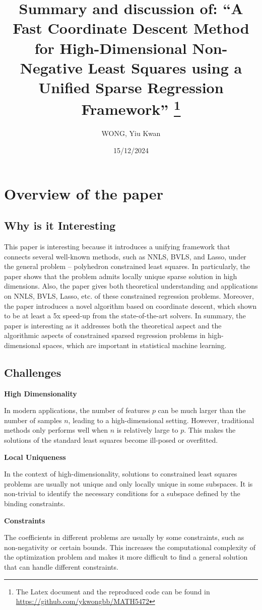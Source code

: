 \documentclass[11pt]{article}
\title{\textbf{Summary and discussion of: ``A Fast Coordinate Descent Method for High-Dimensional Non-Negative Least Squares using a Unified Sparse Regression Framework'' \footnote{The Latex document and the reproduced code can be found in \url{https://github.com/ykwongbb/MATH5472}}}\\}
\author{WONG, Yiu Kwan}
\date{15/12/2024}
\begin{document}
\maketitle
\tableofcontents

\section{Overview of the paper} 
\subsection{Why is it Interesting}
This paper is interesting because it introduces a unifying framework that connects several 
well-known methods, such as NNLS, BVLS, and Lasso, under the general problem -- polyhedron 
constrained least squares. In particularly, the paper shows that the problem admits locally
unique sparse solution in high dimensions. Also, the paper gives both theoretical understanding 
and applications on NNLS, BVLS, Lasso, etc. of these constrained regression problems.
Moreover, the paper introduces a novel algorithm based on coordinate descent, which shown 
to be at least a 5x speed-up from the state-of-the-art solvers. In summary, the paper is interesting 
as it addresses both the theoretical aspect and the algorithmic aspects of constrained sparsed 
regression problems in high-dimensional spaces, which are important in statistical machine learning.


\subsection{Challenges}
\textbf{High Dimensionality}

In modern applications, the number of features $p$ can be much larger than the number of samples
$n$, leading to a high-dimensional setting. However, traditional methods only performs well when
$n$ is relatively large to $p$. This makes the solutions of the standard least squares become 
ill-posed or overfitted.

\textbf{Local Uniqueness}

In the context of high-dimensionality, solutions to constrained least squares problems are usually
not unique and only locally unique in some subspaces. It is non-trivial to identify the necessary 
conditions for a subspace defined by the binding constraints.

\textbf{Constraints}

The coefficients in different problems are usually by some constraints, such as non-negativity or
certain bounds. This increases the computational complexity of the optimization problem and makes 
it more difficult to find a general solution that can handle different constraints.
\end{document}
